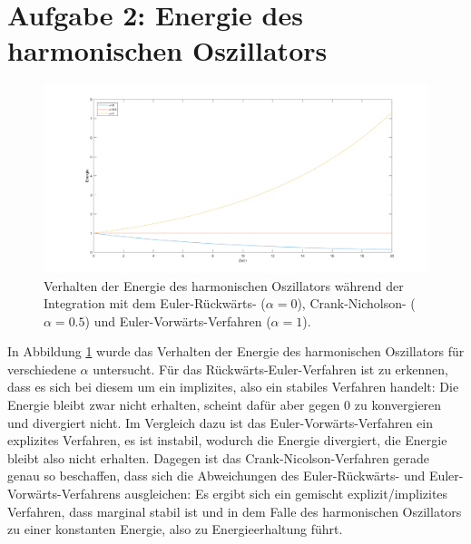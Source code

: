 \documentclass[a4paper, 10pt,onecolumn]{scrartcl}
\begin{document}
\newpage

\section*{Aufgabe 2: Energie des harmonischen Oszillators}
 


\begin{figure}[ht!]
	\includegraphics[scale=0.4,center]{Zeit_2.png}
	\caption{Verhalten der Energie des harmonischen Oszillators während der Integration mit dem Euler-Rückwärts- ($\alpha=0$), Crank-Nicholson- ($\alpha=0.5$) und Euler-Vorwärts-Verfahren ($\alpha=1$).} 
	\label{Abbildung2}
\end{figure}

In Abbildung \ref{Abbildung2} wurde das Verhalten der Energie des harmonischen Oszillators für verschiedene $\alpha$ untersucht. Für das Rückwärts-Euler-Verfahren ist zu erkennen, dass es sich bei diesem um ein implizites, also ein stabiles Verfahren handelt: Die Energie bleibt zwar nicht erhalten, scheint dafür aber gegen 0 zu konvergieren und divergiert nicht. Im Vergleich dazu ist das Euler-Vorwärts-Verfahren ein explizites Verfahren, es ist instabil, wodurch die Energie divergiert, die Energie bleibt also nicht erhalten. Dagegen ist das Crank-Nicolson-Verfahren gerade genau so beschaffen, dass sich die Abweichungen des Euler-Rückwärts- und Euler-Vorwärts-Verfahrens ausgleichen: Es ergibt sich ein gemischt explizit/implizites Verfahren, dass marginal stabil ist und in dem Falle des harmonischen Oszillators zu einer konstanten Energie, also zu Energieerhaltung führt. 
\end{document}
